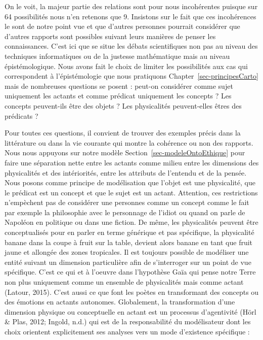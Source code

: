 \documentclass[
  a4paper,
  DIV=11,
  numbers=noendperiod]{scrreprt}
\begin{document}
On le voit, la majeur partie des relations sont pour nous incohérentes
puisque sur 64 possibilités nous n'en retenons que 9. Insistons sur le
fait que ces incohérences le sont de notre point vue et que d'autres
personnes pourrait considérer que d'autres rapports sont possibles
suivant leurs manières de penser les connaissances. C'est ici que se
situe les débats scientifiques non pas au niveau des techniques
informatiques ou de la justesse mathématique mais au niveau
épistémologique. Nous avons fait le choix de limiter les possibilités
aux cas qui correspondent à l'épistémologie que nous pratiquons
Chapter~\ref{sec-principesCarto} mais de nombreuses questions se posent
: peut-on considérer comme sujet uniquement les actants et comme
prédicat uniquement les concepts ? Les concepts peuvent-ils être des
objets ? Les physicalités peuvent-elles êtres des prédicats ?

Pour toutes ces questions, il convient de trouver des exemples précis
dans la littérature ou dans la vie courante qui montre la cohérence ou
non des rapports. Nous nous appuyons sur notre modèle
Section~\ref{sec-modeleOntoEthique} pour faire une séparation nette
entre les actants comme milieu entre les dimensions des physicalités et
des intériorités, entre les attributs de l'entendu et de la pensée. Nous
posons comme principe de modélisation que l'objet est une physicalité,
que le prédicat est un concept et que le sujet est un actant. Attention,
ces restrictions n'empèchent pas de considérer une personnes comme un
concept comme le fait par exemple la philosophie avec le personnage de
l'idiot ou quand on parle de Napoléon en politique ou dans une fiction.
De même, les physicalités peuvent être conceptualisés pour en parler en
terme générique et pas spécifique, la physicalité banane dans la coupe à
fruit sur la table, devient alors banane en tant que fruit jaune et
allongée des zones tropicales. Il est toujours possible de modéliser une
entité suivant un dimension particulière afin de s'interroger sur un
point de vue spécifique. C'est ce qui et à l'oeuvre dans l'hypothèse
Gaïa qui pense notre Terre non plus uniquement comme un ensemble de
physicalités mais comme actant (Latour, 2015). C'est aussi ce que font
les poètes en transformant des concepts ou des émotions en actants
autonomes. Globalement, la transformation d'une dimension physique ou
conceptuelle en actant est un processus d'agentivité (Hörl \& Plas,
2012; Ingold, n.d.) qui est de la responsabilité du modélisateur dont
les choix orientent explicitement ses analyses vers un mode d'existence
spécifique :
\end{document}
